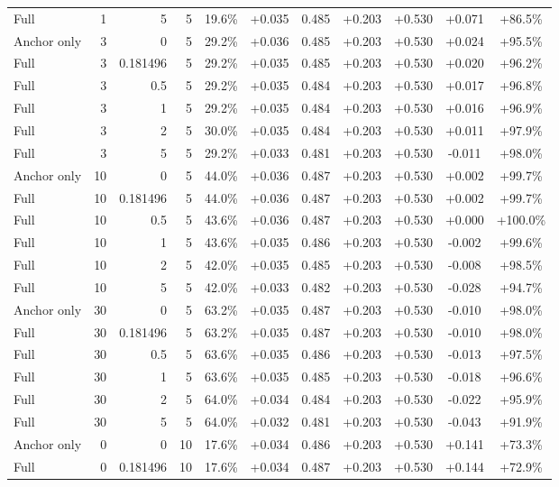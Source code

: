 \begin{table}[htbp]
\begin{tabular}{lrrrccccccc}
Full & 1 & 5 & 5 & 19.6\% & +0.035 & 0.485 & +0.203 & +0.530 & +0.071 & +86.5\% \\
Anchor only & 3 & 0 & 5 & 29.2\% & +0.036 & 0.485 & +0.203 & +0.530 & +0.024 & +95.5\% \\
Full & 3 & 0.181496 & 5 & 29.2\% & +0.035 & 0.485 & +0.203 & +0.530 & +0.020 & +96.2\% \\
Full & 3 & 0.5 & 5 & 29.2\% & +0.035 & 0.484 & +0.203 & +0.530 & +0.017 & +96.8\% \\
Full & 3 & 1 & 5 & 29.2\% & +0.035 & 0.484 & +0.203 & +0.530 & +0.016 & +96.9\% \\
Full & 3 & 2 & 5 & 30.0\% & +0.035 & 0.484 & +0.203 & +0.530 & +0.011 & +97.9\% \\
Full & 3 & 5 & 5 & 29.2\% & +0.033 & 0.481 & +0.203 & +0.530 & -0.011 & +98.0\% \\
Anchor only & 10 & 0 & 5 & 44.0\% & +0.036 & 0.487 & +0.203 & +0.530 & +0.002 & +99.7\% \\
Full & 10 & 0.181496 & 5 & 44.0\% & +0.036 & 0.487 & +0.203 & +0.530 & +0.002 & +99.7\% \\
Full & 10 & 0.5 & 5 & 43.6\% & +0.036 & 0.487 & +0.203 & +0.530 & +0.000 & +100.0\% \\
Full & 10 & 1 & 5 & 43.6\% & +0.035 & 0.486 & +0.203 & +0.530 & -0.002 & +99.6\% \\
Full & 10 & 2 & 5 & 42.0\% & +0.035 & 0.485 & +0.203 & +0.530 & -0.008 & +98.5\% \\
Full & 10 & 5 & 5 & 42.0\% & +0.033 & 0.482 & +0.203 & +0.530 & -0.028 & +94.7\% \\
Anchor only & 30 & 0 & 5 & 63.2\% & +0.035 & 0.487 & +0.203 & +0.530 & -0.010 & +98.0\% \\
Full & 30 & 0.181496 & 5 & 63.2\% & +0.035 & 0.487 & +0.203 & +0.530 & -0.010 & +98.0\% \\
Full & 30 & 0.5 & 5 & 63.6\% & +0.035 & 0.486 & +0.203 & +0.530 & -0.013 & +97.5\% \\
Full & 30 & 1 & 5 & 63.6\% & +0.035 & 0.485 & +0.203 & +0.530 & -0.018 & +96.6\% \\
Full & 30 & 2 & 5 & 64.0\% & +0.034 & 0.484 & +0.203 & +0.530 & -0.022 & +95.9\% \\
Full & 30 & 5 & 5 & 64.0\% & +0.032 & 0.481 & +0.203 & +0.530 & -0.043 & +91.9\% \\
Anchor only & 0 & 0 & 10 & 17.6\% & +0.034 & 0.486 & +0.203 & +0.530 & +0.141 & +73.3\% \\
Full & 0 & 0.181496 & 10 & 17.6\% & +0.034 & 0.487 & +0.203 & +0.530 & +0.144 & +72.9\% \\

\end{tabular}
\end{table}
